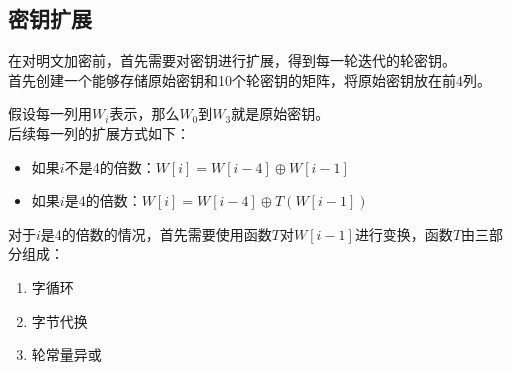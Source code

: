 \vspace{0.5cm}

\subsection{密钥扩展}

在对明文加密前，首先需要对密钥进行扩展，得到每一轮迭代的轮密钥。\\

首先创建一个能够存储原始密钥和10个轮密钥的矩阵，将原始密钥放在前4列。\\

\begin{table}[H]
    \centering
\end{table}

假设每一列用$ W_i $表示，那么$ W_0 $到$ W_3 $就是原始密钥。\\

后续每一列的扩展方式如下：

\begin{itemize}
    \item 如果$ i $不是4的倍数：$ W[i] = W[i-4] \oplus W[i-1] $
    \item 如果$ i $是4的倍数：$ W[i] = W[i-4] \oplus T(W[i-1]) $
\end{itemize}

对于$ i $是4的倍数的情况，首先需要使用函数$ T $对$ W[i-1] $进行变换，函数$ T $由三部分组成：

\begin{enumerate}
    \item 字循环
    \item 字节代换
    \item 轮常量异或
\end{enumerate}

